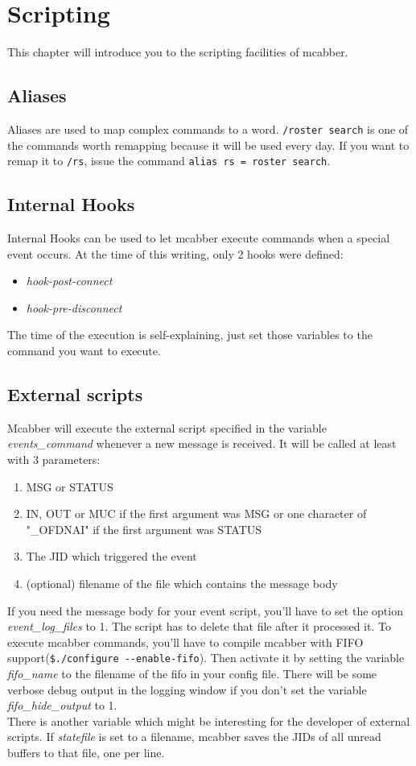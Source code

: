 \documentclass[12pt,oneside,a4]{book}
\begin{document}
\chapter{Scripting}
This chapter will introduce you to the scripting facilities of mcabber.
\section{Aliases}
Aliases are used to map complex commands to a word. \verb+/roster search+ is one of the commands worth remapping
because it will be used every day. If you want to remap it to \verb+/rs+,
issue the command \verb+alias rs = roster search+.
\section{Internal Hooks}
Internal Hooks can be used to let mcabber execute commands when a special event occurs.
At the time of this writing, only 2 hooks were defined:
\begin{itemize}
	\item \textit{hook-post-connect}
	\item \textit{hook-pre-disconnect}
\end{itemize}
The time of the execution is self-explaining, just set those variables to the command you want
to execute.
\section{External scripts}
Mcabber will execute the external script specified in the variable \textit{events\_command} whenever a new
message is received. It will be called at least with 3 parameters:
\begin{enumerate}
	\item MSG or STATUS
	\item	IN, OUT or MUC if the first argument was MSG or one character of "\_OFDNAI" if the first argument was STATUS
	\item The JID which triggered the event
	\item (optional) filename of the file which contains the message body
\end{enumerate}
If you need the message body for your event script, you'll have to set the option \textit{event\_log\_files} to 1.
The script has to delete that file after it processed it. To execute mcabber commands,
you'll have to compile mcabber with FIFO support(\verb+$./configure --enable-fifo+). Then activate it by setting the
variable \textit{fifo\_name} to the filename of the fifo in your config file. There will be some verbose debug
output in the logging window if you don't set the variable \textit{fifo\_hide\_output} to 1.\\
There is another variable which might be interesting for the developer of external scripts.
If \textit{statefile} is set to a filename, mcabber saves the JIDs of all unread buffers to that file, one per line.
\end{document}
